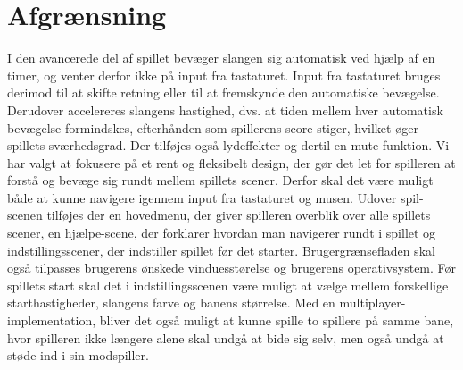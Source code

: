 \section{Afgrænsning}
I den avancerede del af spillet bevæger slangen sig automatisk ved hjælp af en timer, og venter derfor ikke på input fra tastaturet. Input fra tastaturet bruges derimod til at skifte retning eller til at fremskynde den automatiske bevægelse. Derudover accelereres slangens hastighed, dvs. at tiden mellem hver automatisk bevægelse formindskes, efterhånden som spillerens score stiger, hvilket øger spillets sværhedsgrad. Der tilføjes også lydeffekter og dertil en mute-funktion. 
Vi har valgt at fokusere på et rent og fleksibelt design, der gør det let for spilleren at forstå og bevæge sig rundt mellem spillets scener. Derfor skal det være muligt både at kunne navigere igennem input fra tastaturet og musen. Udover spil-scenen tilføjes der en hovedmenu, der giver spilleren overblik over alle spillets scener, en hjælpe-scene, der forklarer hvordan man navigerer rundt i spillet og indstillingsscener, der indstiller spillet før det starter. Brugergrænsefladen skal også tilpasses brugerens ønskede vinduesstørelse og brugerens operativsystem. Før spillets start skal det i indstillingsscenen være muligt at vælge mellem forskellige starthastigheder, slangens farve og banens størrelse.
Med en multiplayer-implementation, bliver det også muligt at kunne spille to spillere på samme bane, hvor spilleren ikke længere alene skal undgå at bide sig selv, men også undgå at støde ind i sin modspiller.